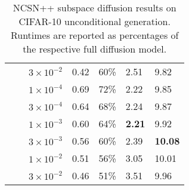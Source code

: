 \documentclass{article}
\begin{document}
\begin{table}[h!]
\begin{tabularx}{\textwidth}{YYYYYYY}
    & & $3\times 10^{-2}$ & 0.42	& 60\%	&	2.51	&	9.82 \\  \cmidrule(lr){2-7}
    &    
      & $1\times 10^{-4}$ & 0.69	& 72\%	&	2.22	&	9.85 \\
    & & $3\times 10^{-4}$ & 0.64	& 68\%	&	2.24	&	9.87 \\
    & & $1\times 10^{-3}$ & 0.60	& 64\%	&	\textbf{2.21}	&	9.92 \\
    & & $3\times 10^{-3}$ & 0.56	& 60\%	&	2.39	&	\textbf{10.08} \\
    & & $1\times 10^{-2}$ & 0.51	& 56\%	&	3.05	&	10.01 \\
    & & $3\times 10^{-2}$ & 0.46	& 51\%	&	3.51	&	9.96 \\  \bottomrule
    \end{tabularx}
    \caption{NCSN++ subspace diffusion results on CIFAR-10 unconditional generation. Runtimes are reported as percentages of the respective full diffusion model.}
    \label{tab:cifar_ncsn}
\end{table}
\end{document}
